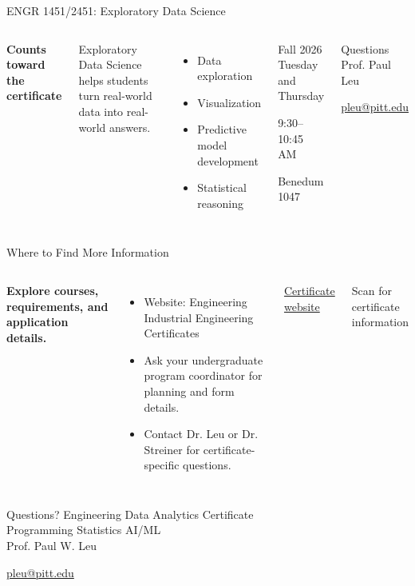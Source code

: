 \documentclass[aspectratio=169,11pt,t]{beamer}
\newcommand{\tightitems}{\setlength\itemsep{1pt}\setlength\parskip{0pt}}
\begin{document}
\begin{frame}[t]{ENGR 1451/2451: Exploratory Data Science}
\begin{columns}[T,onlytextwidth]
\textbf{Counts toward the certificate}\par
\vspace{0.25cm}
Exploratory Data Science helps students turn real-world data into real-world answers.

\vspace{0.25cm}
\begin{itemize}[<+->]
  \tightitems
  \item Data exploration
  \item Visualization
  \item Predictive model development
  \item Statistical reasoning
\end{itemize}

\begin{block}{Fall 2026}
Tuesday and Thursday\par
9:30--10:45 AM\par
Benedum 1047
\end{block}
\begin{block}{Questions}
Prof. Paul Leu\par
\href{mailto:pleu@pitt.edu}{pleu@pitt.edu}
\end{block}
\end{columns}
\end{frame}

\begin{frame}[t]{Where to Find More Information}
\begin{columns}[T,onlytextwidth]
\textbf{Explore courses, requirements, and application details.}

\vspace{0.25cm}
\begin{itemize}[<+->]
  \item Website: Engineering \textrightarrow{} Industrial Engineering \textrightarrow{} Certificates
  \item Ask your undergraduate program coordinator for planning and form details.
  \item Contact Dr. Leu or Dr. Streiner for certificate-specific questions.
\end{itemize}

\vspace{0.2cm}
\href{https://www.engineering.pitt.edu/departments/industrial/undergraduate/degrees/certificates/}{Certificate website}

\centering
{}

\vspace{0.2cm}
\small Scan for certificate information
\end{columns}
\end{frame}

\begin{frame}[t]{Questions?}
\centering
\Huge Engineering Data Analytics Certificate\\[0.35cm]
\Large Programming \quad Statistics \quad AI/ML\\[0.7cm]
\normalsize
Prof. Paul W. Leu\par
\href{mailto:pleu@pitt.edu}{pleu@pitt.edu}
\end{frame}
\end{document}
